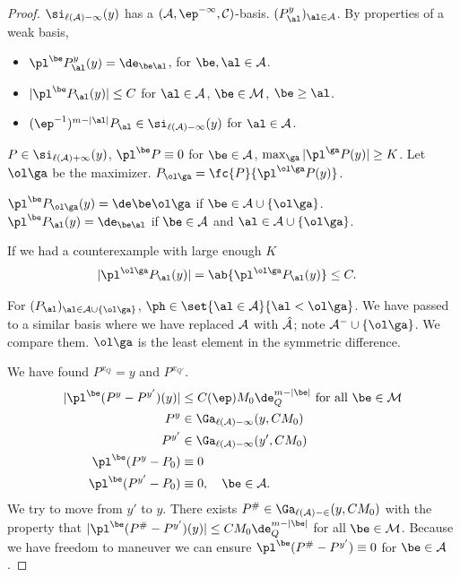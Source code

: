 \begin{proof}
$\si_{\ell(\cal A)-1}(y)$ has a $(\cal A, \ep^{-1}, C)$-basis. $(P_\al^y)_{\al\in \cal A}$.
By properties of a weak basis,
\begin{itemize}
\item
$\pl^\be P_\al^y(y) = \de_{\be\al}$, for $\be, \al\in \cal A$.
\item
$|\pl^\be P_\al(y)|\le C$ for $\al\in \cal A$, $\be \in \cal M$, $\be \ge \al$.
\item
$(\ep^{-1})^{m-|\al|} P_\al \in \si_{\ell(\cal A)-1}(y)$ for $\al \in \cal A$. 
\end{itemize}
$P\in \si_{\ell(\cal A)+1}(y)$, $\pl^\be P\equiv 0$ for $\be\in \cal A$, $\max_\ga |\pl^\ga P(y)|\ge K$. Let $\ol \ga$ be the maximizer. $P_{\ol \ga} = \fc{P}{\pl^{\ol \ga}P(y)}$.  %

$\pl^\be P_{\ol \ga}(y) = \de \be \ol\ga$ if $\be \in \cal A\cup \{\ol\ga\}$.
$\pl^\be P_\al (y) =\de_{\be \al}$ if $\be\in \cal A$ and $\al\in \cal A\cup \{\ol\ga\}$. 

If we had a counterexample with large enough $K$
\begin{align}
|\pl^{\ol \ga}P_\al(y)|
&= \ab{\pl^{\ol \ga}P_\al(y)}
\le C.
\end{align}

For $(P_\al)_{\al\in \cal A\cup \{\ol \ga\}}$, $\ph \in \set{\al\in \cal A}{\al <\ol\ga}$. %
We have passed to a similar basis where we have replaced $\cal A$ with $\hat{\cal A}$; note $\cal A^-\cup \{\ol \ga\}$. We compare them. $\ol \ga$ is the least element in the symmetric difference.

We have found $P^{x_Q}=y$ and $P^{x_{Q'}}$. %
\begin{align}
|\pl^\be (P^y - P^{y'})(y)|
&\le C(\ep) M_0\de_Q^{m-|\be|}
\text{ for all }\be \in \cal M\\
P^y&\in \Ga_{\ell(\cal A)-1}(y,CM_0)\\
P^{y'}&\in \Ga_{\ell(\cal A)-1} (y', CM_0)\\
\pl^\be(P^y-P_0) &\equiv 0\\
\pl^\be (P^{y'}-P_0) &\equiv 0, \quad \be \in \cal A.
\end{align}
We try to move from $y'$ to $y$. 
There exists $P^\#\in \Ga_{\ell(\cal A)-2}(y,CM_0)$ with the property that
$|\pl^\be (P^\# - P^{y'})(y)|\le CM_0\de_Q^{m-|\be|}$ for all $\be\in \cal M$. Because we have freedom to maneuver we can ensure $\pl^\be (P^\# - P^{y'}) \equiv 0$ for $\be \in \cal A$. 


\end{proof}
